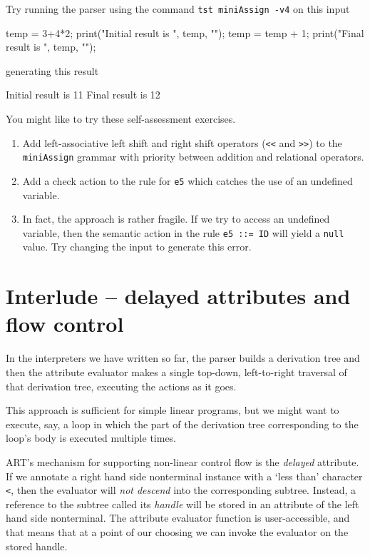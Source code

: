 Try running the parser using the command {\tt tst miniAssign -v4} on this input
\begin{codeblock}
temp = 3+4*2;
print("Initial result is ", temp, "\n");
temp = temp + 1;
print("Final result is ", temp, "\n");
\end{codeblock}
generating this result
\begin{codeblock}
Initial result is 11
Final result is 12
\end{codeblock}

You might like to try these self-assessment exercises.

\begin{enumerate}
\item Add left-associative left shift and right shift operators (\verb+<<+ and
  \verb+>>+) to the {\tt miniAssign} grammar with priority between addition and relational operators.

\item Add a check action to the rule for \verb+e5+ which catches the
  use of an undefined variable.
\item In fact, the approach is rather fragile. If we try to access an
undefined variable, then the semantic action in the rule
\verb+e5 ::= ID+ will yield a {\tt null} value. Try changing the input
to generate this error.
\end{enumerate}
\clearpage
\section{Interlude -- delayed attributes and flow control}
In the interpreters we have written so far, the parser builds a derivation tree and then the attribute evaluator makes a single top-down, left-to-right traversal of that derivation tree, executing the actions as it goes.

This approach is sufficient for simple linear programs, but we might want to execute, say, a loop in which the part of the derivation tree corresponding to the loop's body is executed multiple times.

ART's mechanism for supporting non-linear control flow is the {\em delayed} attribute. If we annotate a right hand side nonterminal instance with a `less than' character \verb+<+, then the evaluator will {\em not descend} into the corresponding subtree. Instead, a reference to the subtree called its {\em handle} will be stored in an attribute of the left hand side nonterminal. The attribute evaluator function is user-accessible, and that means that at a point of our choosing we can invoke the evaluator on the stored handle.

